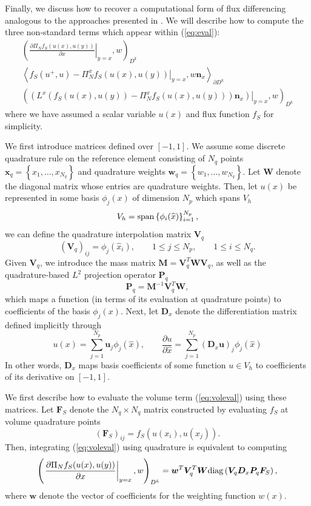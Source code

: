 \documentclass[preprint,10pt]{article}
\theoremstyle{definition}
\theoremstyle{lemma}
\theoremstyle{theorem}
\theoremstyle{assumption}
\newcommand{\pd}[2]{\frac{\partial#1}{\partial#2}}
\newcommand{\LRp}[1]{\left( #1 \right)}
\newcommand{\LRa}[1]{\left\langle #1 \right\rangle}
\newcommand{\LRc}[1]{\left\{ #1 \right\}}
\begin{document}
Finally, we discuss how to recover a computational form of flux differencing analogous to the approaches presented in \cite{gassner2016split, chen2017entropy}.  We will describe how to compute the three non-standard terms which appear within (\ref{eq:eval}):
\begin{align}
\LRp{\left.\pd{\Pi_N {f}_S({u}(x),{u}(y))}{x}\right|_{y=x},{w}}_{D^k}\label{eq:voleval}\\
\LRa{{f}_S({u}^+,{u})-\left.\Pi_N^x{f}_S({u}(x),{u}(y))\right|_{y=x},{w}\bm{n}_x}_{\partial D^k}\label{eq:surfeval}\\
\LRp{\left.\LRp{L^x\LRp{{f}_S({u}(x),{u}(y)) - \Pi_N^x{f}_S({u}(x),{u}(y))}\bm{n}_x}\right|_{y=x},{w}}_{D^k}\label{eq:volsurfeval}
\end{align}
where we have assumed a scalar variable $u(x)$ and flux function $f_S$ for simplicity.  

We first introduce matrices defined over $[-1,1]$.  We assume some discrete quadrature rule on the reference element consisting of $N_q$ points ${\bm{x}}_q = \LRc{{x}_1,\ldots,{x}_{N_q}}$ and quadrature weights $\bm{w}_q = \LRc{w_1,\ldots,w_{N_q}}$.  Let $\bm{W}$ denote the diagonal matrix whose entries are quadrature weights. Then, let $u(x)$ be represented in some basis $\phi_j(x)$ of dimension $N_p$ which spans $V_h$
\[
V_h = {\rm span}\LRc{\phi_i(\widehat{x})}_{i=1}^{N_p},
\]
we can define the quadrature interpolation matrix $\bm{V}_q$
\[
\LRp{\bm{V}_q}_{ij} = \phi_j(\widehat{x}_i), \qquad 1 \leq j \leq N_p, \qquad 1 \leq i \leq N_q.  
\]
Given $\bm{V}_q$, we introduce the mass matrix $\bm{M} = \bm{V}_q^T\bm{W}\bm{V}_q$, as well as the quadrature-based $L^2$ projection operator $\bm{P}_q$
\[
\bm{P}_q = \bm{M}^{-1}\bm{V}_q^T\bm{W},
\]
which maps a function (in terms of its evaluation at quadrature points) to coefficients of the basis $\phi_j(x)$.  Next, let $\bm{D}_x$ denote the differentiation matrix defined implicitly through
\[
u(x) = \sum_{j=1}^{N_p} \bm{u}_j \phi_j(\widehat{x}), \qquad \pd{u}{\widehat{x}} = \sum_{j=1}^{N_p} \LRp{\bm{D}_x \bm{u}}_j\phi_j(\widehat{x})
\]
In other words, $\bm{D}_x$ maps basis coefficients of some function $u \in V_h$ to coefficients of its derivative on $[-1,1]$.  

We first describe how to evaluate the volume term (\ref{eq:voleval}) using these matrices.  Let $\bm{F}_S$ denote the $N_q\times N_q$ matrix constructed by evaluating $f_S$ at volume quadrature points
\[
\LRp{\bm{F}_S}_{ij} = f_S(u(x_i),u(x_j)).  
\]
Then, integrating (\ref{eq:voleval}) using quadrature is equivalent to computing
\[
\LRp{\left.\pd{\Pi_N {f}_S({u}(x),{u}(y))}{x}\right|_{y=x},{w}}_{D^k} = \bm{w}^T \bm{V}_q^T\bm{W} {\rm diag}\LRp{\bm{V}_q\bm{D}_x\bm{P}_q \bm{F}_S},  
\]
where $\bm{w}$ denote the vector of coefficients for the weighting function $w(x)$.  
\end{document}
